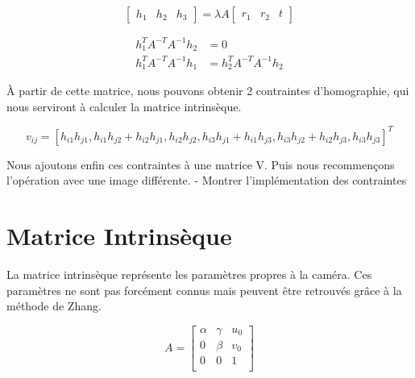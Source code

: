 \documentclass[a4paper]{article}
\begin{document}
\begin{equation}
  \begin{bmatrix}
    h_1 & h_2 & h_3
  \end{bmatrix}
  = \lambda A
  \begin{bmatrix}
    r_1 & r_2 & t
  \end{bmatrix}
\end{equation}

\begin{equation}
  \begin{aligned}
    h_1^T A^{-T} A^{-1} h_2 &= 0 \\
    h_1^T A^{-T} A^{-1} h_1 &= h_2^T A^{-T} A^{-1} h_2
  \end{aligned}
\end{equation}

À partir de cette matrice, nous pouvons obtenir 2 contraintes d'homographie, qui nous serviront à calculer la matrice intrinsèque.

\begin{equation}
  v_{ij} = [h_{i1} h_{j1} , h_{i1} h_{j2} + h_{i2} h_{j1} , h_{i2} h_{j2} ,
h_{i3} h_{j1} + h_{i1} h_{j3} , h_{i3} h_{j2} + h_{i2} h_{j3} , h_{i3} h_{j3} ]^T
\end{equation}

Nous ajoutons enfin ces contraintes à une matrice V. Puis nous recommençons l'opération avec une image différente.
- Montrer l'implémentation des contraintes

\clearpage

\section{Matrice Intrinsèque}

La matrice intrinsèque représente les paramètres propres à la caméra. Ces paramètres ne sont pas forcément connus mais peuvent être retrouvés grâce à la méthode de Zhang.

\begin{equation}
  A=
  \begin{bmatrix}
   \alpha & \gamma & u_0 \\
   0 & \beta & v_0 \\
   0 & 0 & 1 \\
  \end{bmatrix}
\end{equation}
\end{document}
